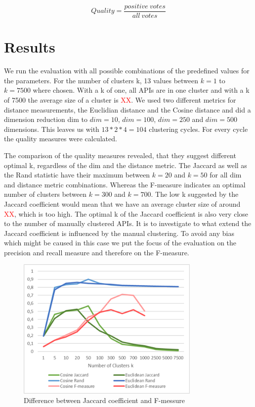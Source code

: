 \documentclass[a4paper]{IEEEtran}
\begin{document}
\begin{equation*}
Quality= \frac{positive~votes}{all~votes}
\end{equation*}

\section{Results}
We run the evaluation with all possible combinations of the predefined values for the parameters. For the number of clusters k, 13 values between $k=1$ to $k=7500$ where chosen. With a k of one, all APIs are in one cluster and with a k of 7500 the average size of a cluster is \textcolor{red} {XX}. We used two different metrics for distance measurements, the Euclidian distance and the Cosine distance and did a dimension reduction dim to $dim⁡= 10$, $dim⁡= 100$, $dim⁡=  250$ and  $dim⁡= 500$ dimensions. This leaves us with $13*2*4=104$ clustering cycles. For every cycle the quality measures were calculated.

The comparison of the quality measures revealed, that they suggest different optimal k, regardless of the dim and the distance metric. The Jaccard as well as the Rand statistic have their maximum between $k=20$ and $k=50$ for all dim and distance metric combinations. Whereas the F-measure indicates an optimal number of clusters between $k=300$ and $k=700$.
The low k suggested by the Jaccard coefficient would mean that we have an average cluster size of around \textcolor{red} {XX}, which is too high. The optimal k of the Jaccard coefficient is also very close to the number of manually clustered APIs. It is to investigate to what extend the Jaccard coefficient is influenced by the manual clustering. To avoid any bias which might be caused in this case we put the focus of the evaluation on the precision and recall measure and therefore on the F-measure.


\begin{figure}[!t]
\centering
\includegraphics[width= 3.5in]{img/Jaccard.png}
\caption{Difference between Jaccard coefficient and F-messure}
\label{fig_sim}
\end{figure}
\end{document}
